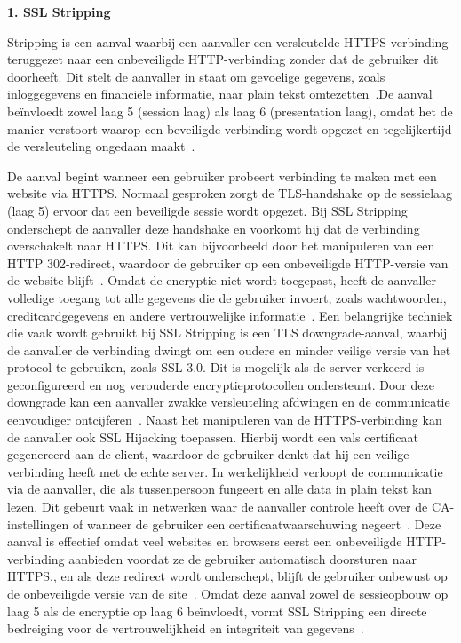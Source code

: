\label{sec:MitM-aanvallen op de Sessielaag en Presentatielaag}
\vspace{0.5cm}
\textbf{1. SSL Stripping}

 Stripping is een aanval waarbij een aanvaller een versleutelde HTTPS-verbinding teruggezet naar een onbeveiligde HTTP-verbinding zonder dat de gebruiker dit doorheeft. Dit stelt de aanvaller in staat om gevoelige gegevens, zoals inloggegevens en financiële informatie, naar plain tekst omtezetten~\autocite{gangan2015}.De aanval beïnvloedt zowel laag 5 (session laag) als laag 6 (presentation laag), omdat het de manier verstoort waarop een beveiligde verbinding wordt opgezet en tegelijkertijd de versleuteling ongedaan maakt~\autocite{gangan2015}.

De aanval begint wanneer een gebruiker probeert verbinding te maken met een website via HTTPS. Normaal gesproken zorgt de TLS-handshake op de sessielaag (laag 5) ervoor dat een beveiligde sessie wordt opgezet. Bij SSL Stripping onderschept de aanvaller deze handshake en voorkomt hij dat de verbinding overschakelt naar HTTPS. Dit kan bijvoorbeeld door het manipuleren van een HTTP 302-redirect, waardoor de gebruiker op een onbeveiligde HTTP-versie van de website blijft~\autocite{gangan2015}. Omdat de encryptie niet wordt toegepast, heeft de aanvaller volledige toegang tot alle gegevens die de gebruiker invoert, zoals wachtwoorden, creditcardgegevens en andere vertrouwelijke informatie~\autocite{gangan2015}.
Een belangrijke techniek die vaak wordt gebruikt bij SSL Stripping is een TLS downgrade-aanval, waarbij de aanvaller de verbinding dwingt om een oudere en minder veilige versie van het protocol te gebruiken, zoals SSL 3.0. Dit is mogelijk als de server verkeerd is geconfigureerd en nog verouderde encryptieprotocollen ondersteunt. Door deze downgrade kan een aanvaller zwakke versleuteling afdwingen en de communicatie eenvoudiger ontcijferen~\autocite{gangan2015}.
Naast het manipuleren van de HTTPS-verbinding kan de aanvaller ook SSL Hijacking toepassen. Hierbij wordt een vals certificaat gegenereerd aan de client, waardoor de gebruiker denkt dat hij een veilige verbinding heeft met de echte server. In werkelijkheid verloopt de communicatie via de aanvaller, die als tussenpersoon fungeert en alle data in plain tekst kan lezen. Dit gebeurt vaak in netwerken waar de aanvaller controle heeft over de CA-instellingen of wanneer de gebruiker een certificaatwaarschuwing negeert~\autocite{gangan2015}.
Deze aanval is effectief omdat veel websites en browsers eerst een onbeveiligde HTTP-verbinding aanbieden voordat ze de gebruiker automatisch doorsturen naar HTTPS., en als deze redirect wordt onderschept, blijft de gebruiker onbewust op de onbeveiligde versie van de site~\autocite{gangan2015}. Omdat deze aanval zowel de sessieopbouw op laag 5 als de encryptie op laag 6 beïnvloedt, vormt SSL Stripping een directe bedreiging voor de vertrouwelijkheid en integriteit van gegevens~\autocite{gangan2015}.

